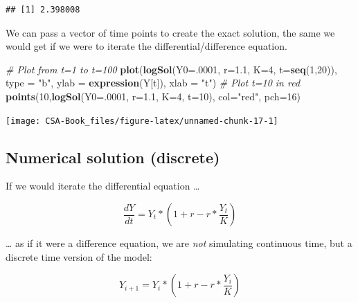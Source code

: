 \documentclass[12pt,]{book}
\newenvironment{Shaded}{\begin{snugshade}}{\end{snugshade}}
\newcommand{\CommentTok}[1]{\textcolor[rgb]{0.56,0.35,0.01}{\textit{#1}}}
\newcommand{\DataTypeTok}[1]{\textcolor[rgb]{0.13,0.29,0.53}{#1}}
\newcommand{\DecValTok}[1]{\textcolor[rgb]{0.00,0.00,0.81}{#1}}
\newcommand{\FloatTok}[1]{\textcolor[rgb]{0.00,0.00,0.81}{#1}}
\newcommand{\KeywordTok}[1]{\textcolor[rgb]{0.13,0.29,0.53}{\textbf{#1}}}
\newcommand{\NormalTok}[1]{#1}
\newcommand{\StringTok}[1]{\textcolor[rgb]{0.31,0.60,0.02}{#1}}
\begin{document}
\begin{verbatim}
## [1] 2.398008
\end{verbatim}

We can pass a vector of time points to create the exact solution, the same we would get if we were to iterate the differential/difference equation.

\begin{Shaded}
\begin{Highlighting}[]
\CommentTok{# Plot from t=1 to t=100}
\KeywordTok{plot}\NormalTok{(}\KeywordTok{logSol}\NormalTok{(}\DataTypeTok{Y0=}\NormalTok{.}\DecValTok{0001}\NormalTok{, }\DataTypeTok{r=}\FloatTok{1.1}\NormalTok{, }\DataTypeTok{K=}\DecValTok{4}\NormalTok{, }\DataTypeTok{t=}\KeywordTok{seq}\NormalTok{(}\DecValTok{1}\NormalTok{,}\DecValTok{20}\NormalTok{)), }\DataTypeTok{type =} \StringTok{"b"}\NormalTok{, }
     \DataTypeTok{ylab =} \KeywordTok{expression}\NormalTok{(Y[t]), }\DataTypeTok{xlab =} \StringTok{"t"}\NormalTok{)}
\CommentTok{# Plot t=10 in red}
\KeywordTok{points}\NormalTok{(}\DecValTok{10}\NormalTok{,}\KeywordTok{logSol}\NormalTok{(}\DataTypeTok{Y0=}\NormalTok{.}\DecValTok{0001}\NormalTok{, }\DataTypeTok{r=}\FloatTok{1.1}\NormalTok{, }\DataTypeTok{K=}\DecValTok{4}\NormalTok{, }\DataTypeTok{t=}\DecValTok{10}\NormalTok{), }\DataTypeTok{col=}\StringTok{"red"}\NormalTok{, }\DataTypeTok{pch=}\DecValTok{16}\NormalTok{)}
\end{Highlighting}
\end{Shaded}

\begin{center}\texttt{[image: CSA-Book\_files/figure-latex/unnamed-chunk-17-1]} \end{center}

\hypertarget{numerical-solution-discrete}{%
\subsection*{Numerical solution (discrete)}\label{numerical-solution-discrete}}

If we would iterate the differential equation \ldots{}

\[
\frac{dY}{dt} = Y_t * (1 + r - r * \frac{Y_t}{K})
\]

\ldots{} as if it were a difference equation, we are \emph{not} simulating continuous time, but a discrete time version of the model:

\[
Y_{i+1} = Y_i * (1 + r - r * \frac{Y_i}{K})
\]
\end{document}
